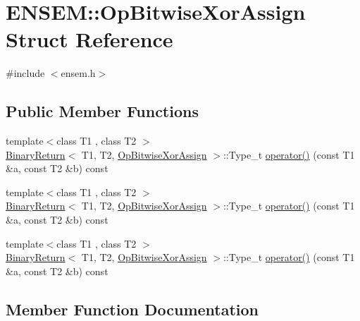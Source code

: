 \hypertarget{structENSEM_1_1OpBitwiseXorAssign}{}\section{E\+N\+S\+EM\+:\+:Op\+Bitwise\+Xor\+Assign Struct Reference}
\label{structENSEM_1_1OpBitwiseXorAssign}


{\ttfamily \#include $<$ensem.\+h$>$}

\subsection*{Public Member Functions}
\begin{DoxyCompactItemize}
\item 
{\footnotesize template$<$class T1 , class T2 $>$ }\\\mbox{\hyperlink{structENSEM_1_1BinaryReturn}{Binary\+Return}}$<$ T1, T2, \mbox{\hyperlink{structENSEM_1_1OpBitwiseXorAssign}{Op\+Bitwise\+Xor\+Assign}} $>$\+::Type\+\_\+t \mbox{\hyperlink{structENSEM_1_1OpBitwiseXorAssign_a4052fafdb4677ce5a429ae23383ed469}{operator()}} (const T1 \&a, const T2 \&b) const
\item 
{\footnotesize template$<$class T1 , class T2 $>$ }\\\mbox{\hyperlink{structENSEM_1_1BinaryReturn}{Binary\+Return}}$<$ T1, T2, \mbox{\hyperlink{structENSEM_1_1OpBitwiseXorAssign}{Op\+Bitwise\+Xor\+Assign}} $>$\+::Type\+\_\+t \mbox{\hyperlink{structENSEM_1_1OpBitwiseXorAssign_a4052fafdb4677ce5a429ae23383ed469}{operator()}} (const T1 \&a, const T2 \&b) const
\item 
{\footnotesize template$<$class T1 , class T2 $>$ }\\\mbox{\hyperlink{structENSEM_1_1BinaryReturn}{Binary\+Return}}$<$ T1, T2, \mbox{\hyperlink{structENSEM_1_1OpBitwiseXorAssign}{Op\+Bitwise\+Xor\+Assign}} $>$\+::Type\+\_\+t \mbox{\hyperlink{structENSEM_1_1OpBitwiseXorAssign_a4052fafdb4677ce5a429ae23383ed469}{operator()}} (const T1 \&a, const T2 \&b) const
\end{DoxyCompactItemize}


\subsection{Member Function Documentation}
\mbox{\label{structENSEM_1_1OpBitwiseXorAssign_a4052fafdb4677ce5a429ae23383ed469}} 
